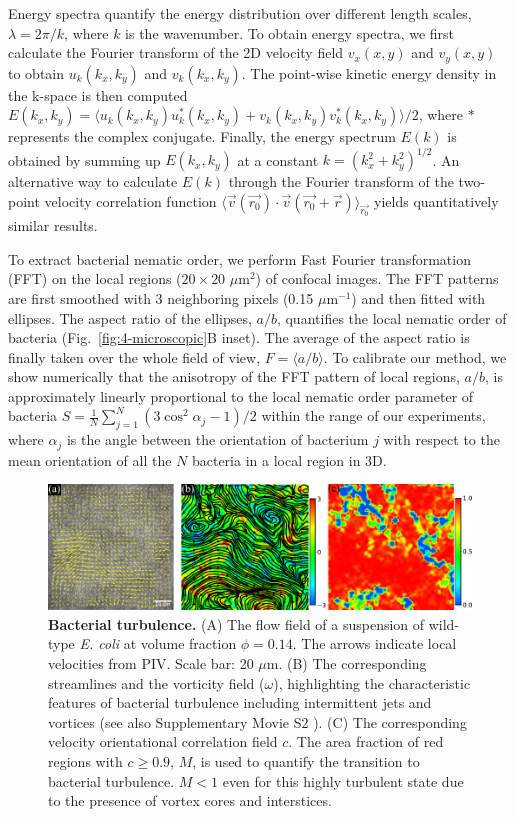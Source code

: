 Energy spectra quantify the energy distribution over different length scales, $\lambda = 2\pi/k$, where $k$ is the wavenumber. To obtain energy spectra, we first calculate the Fourier transform of the 2D velocity field $v_x(x,y)$ and $v_y(x,y)$ to obtain $u_k(k_x,k_y)$ and $v_k(k_x,k_y)$. The point-wise kinetic energy density in the k-space is then computed $E(k_x, k_y) = \langle u_k(k_x, k_y)u^*_k(k_x, k_y)+v_k(k_x, k_y)v_k^*(k_x, k_y)\rangle/2$, where $*$ represents the complex conjugate. Finally, the energy
spectrum $E(k)$ is obtained by summing up $E(k_x,k_y)$ at a constant $k=(k_x^2+k_y^2)^{1/2}$. An alternative way to calculate $E(k)$ through the Fourier transform of the two-point velocity correlation function $\langle \vec{v}(\vec{r_0})\cdot\vec{v}(\vec{r_0}+\vec{r})  \rangle_{\vec{r_0}}$ yields quantitatively similar results.

To extract bacterial nematic order, we perform Fast Fourier transformation (FFT) on the local regions ($20 \times 20$ $\mu$m$^2$) of confocal images.
The FFT patterns are first smoothed with 3 neighboring pixels (0.15 $\mu$m$^{-1}$) and then fitted with ellipses. The aspect ratio of the ellipses, $a/b$, quantifies the local nematic order of bacteria (Fig.~\ref{fig:4-microscopic}B inset).
The average of the aspect ratio is finally taken over the whole field of view, $F = \langle a/b \rangle$. To calibrate our method, we show numerically that the anisotropy of the FFT pattern of local regions, $a/b$, is approximately linearly proportional to the local nematic order parameter of bacteria $S=\frac{1}{N}\sum_{j=1}^N(3\cos^2\alpha_j - 1)/2$ within the range of our experiments, where $\alpha_j$ is the angle between the orientation of bacterium $j$ with respect to the mean orientation of all the $N$ bacteria in a local region in 3D.

\begin{figure}[!ht]
	\begin{center}
	\includegraphics[width=5.5 in]{Figs/4-Emergence/1.pdf}
	\end{center}
	\caption[Bacterial turbulence]
	{
	\textbf{Bacterial turbulence.}
  (A) The flow field of a suspension of wild-type \textit{E. coli} at volume fraction $\phi=0.14$. The arrows indicate local velocities from PIV. Scale bar: 20 $\mu$m.
  (B) The corresponding streamlines and the vorticity field ($\omega$), highlighting the characteristic features of bacterial turbulence including intermittent jets and vortices (see also Supplementary Movie S2 \cite{suppMovies}).
  (C) The corresponding velocity orientational correlation field $c$. The area fraction of red regions with $c \ge 0.9$, $M$, is used to quantify the transition to bacterial turbulence. $M < 1$ even for this highly turbulent state due to the presence of vortex cores and interstices.
	}
	\label{fig:4-turbulence}
\end{figure}

